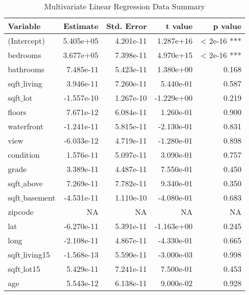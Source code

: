 \documentclass[a4paper, 8pt]{article}
\begin{document}
\begin{table}[ht]
\centering
\begin{tabular}{|l|r|r|r|r|}
\hline
\textbf{Variable} & \textbf{Estimate} & \textbf{Std. Error} & \textbf{t value} & \textbf{p value} \\
\hline
(Intercept)       & 5.405e+05   & 4.201e-11  & 1.287e+16  & < 2e-16 ***  \\
bedrooms          & 3.677e+05   & 7.398e-11  & 4.970e+15  & < 2e-16 ***  \\
bathrooms         & 7.485e-11   & 5.423e-11  & 1.380e+00  & 0.168        \\
sqft$\_$living       & 3.946e-11   & 7.260e-11  & 5.440e-01  & 0.587        \\
sqft$\_$lot          & -1.557e-10  & 1.267e-10  & -1.229e+00 & 0.219        \\
floors            & 7.671e-12   & 6.084e-11  & 1.260e-01  & 0.900        \\
waterfront        & -1.241e-11  & 5.815e-11  & -2.130e-01 & 0.831        \\
view              & -6.033e-12  & 4.719e-11  & -1.280e-01 & 0.898        \\
condition         & 1.576e-11   & 5.097e-11  & 3.090e-01  & 0.757        \\
grade             & 3.389e-11   & 4.487e-11  & 7.550e-01  & 0.450        \\
sqft$\_$above        & 7.269e-11   & 7.782e-11  & 9.340e-01  & 0.350        \\
sqft$\_$basement     & -4.531e-11  & 1.110e-10  & -4.080e-01 & 0.683        \\
zipcode           & NA          & NA         & NA         & NA           \\
lat               & -6.270e-11  & 5.391e-11  & -1.163e+00 & 0.245        \\
long              & -2.108e-11  & 4.867e-11  & -4.330e-01 & 0.665        \\
sqft$\_$living15     & -1.568e-13  & 5.590e-11  & -3.000e-03 & 0.998        \\
sqft$\_$lot15        & 5.429e-11   & 7.241e-11  & 7.500e-01  & 0.453        \\
age               & 5.543e-12   & 6.138e-11  & 9.000e-02  & 0.928        \\
\hline
\end{tabular}
\caption{Multivariate Linear Regression Data Summary}
\end{table}
\end{document}
